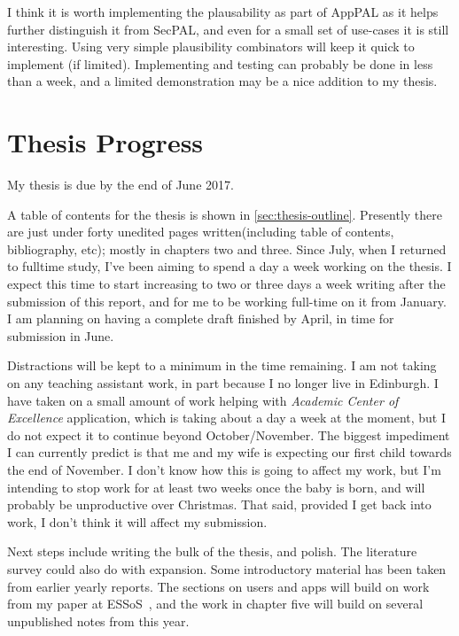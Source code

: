 \documentclass[a4paper]{scrartcl}
\begin{document}
I think it is worth implementing the plausability as part of AppPAL as it helps
further distinguish it from SecPAL, and even for a small set of use-cases it is
still interesting.  Using very simple plausibility combinators will keep it
quick to implement (if limited).  Implementing and testing can probably be done
in less than a week, and a limited demonstration may be a nice addition to my thesis.

\section{Thesis Progress}
\label{sec:thesis}

My thesis is due by the end of June 2017.

A table of contents for the thesis is shown in \autoref{sec:thesis-outline}.
Presently there are just under forty unedited pages written(including table of contents,
bibliography, etc); mostly in chapters two and three. Since July, when I
returned to fulltime study, I've been aiming to spend a day a week working on
the thesis.  I expect this time to start increasing to two or three days a week
writing after the submission of this report, and for me to be working full-time
on it from January.  I am planning on having a complete draft finished by April,
in time for submission in June.

Distractions will be kept to a minimum in the time remaining.
I am not taking on any teaching assistant work, in part because I
no longer live in Edinburgh.  I have taken on a small amount of work helping
with \emph{Academic Center of Excellence} application, which is taking about a
day a week at the moment, but I do not expect it to continue beyond
October/November.
The biggest impediment I can currently predict is that me and my wife is expecting our
first child towards the end of November.  I don't know how this is going to
affect my work, but I'm intending to stop work for at least two weeks once the
baby is born, and will probably be unproductive over Christmas.  That said,
provided I get back into work, I don't think it will affect my submission.

Next steps include writing the bulk of the thesis, and polish.  The literature
survey could also do with expansion.  Some introductory material has been
taken from earlier yearly reports.  The sections on users and apps will build on
work from my paper at ESSoS~\cite{hallett_apppal_2016}, and the work in chapter
five will build on several unpublished notes from this year.
\end{document}
